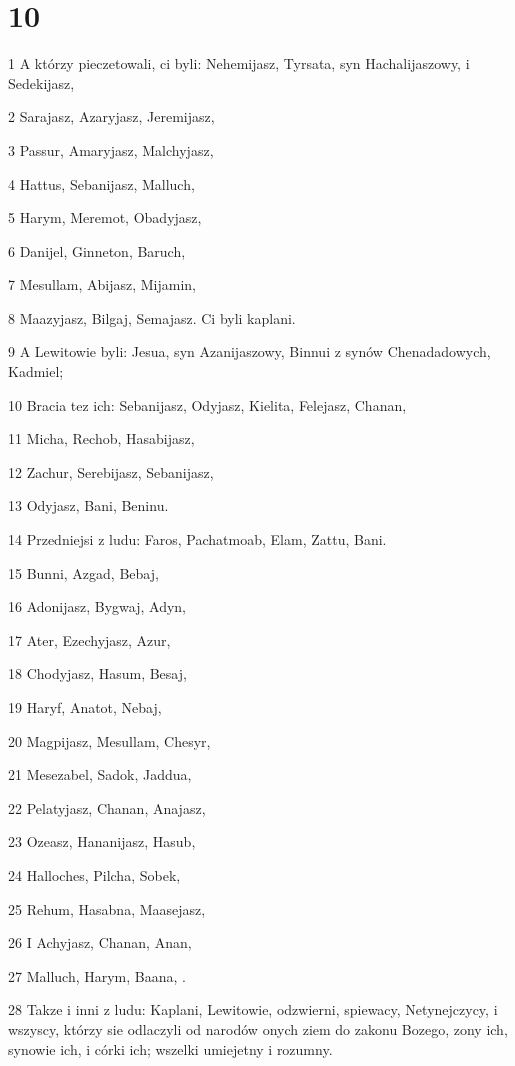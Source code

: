 \chapter{10}

\par 1 A którzy pieczetowali, ci byli: Nehemijasz, Tyrsata, syn Hachalijaszowy, i Sedekijasz,
\par 2 Sarajasz, Azaryjasz, Jeremijasz,
\par 3 Passur, Amaryjasz, Malchyjasz,
\par 4 Hattus, Sebanijasz, Malluch,
\par 5 Harym, Meremot, Obadyjasz,
\par 6 Danijel, Ginneton, Baruch,
\par 7 Mesullam, Abijasz, Mijamin,
\par 8 Maazyjasz, Bilgaj, Semajasz. Ci byli kaplani.
\par 9 A Lewitowie byli: Jesua, syn Azanijaszowy, Binnui z synów Chenadadowych, Kadmiel;
\par 10 Bracia tez ich: Sebanijasz, Odyjasz, Kielita, Felejasz, Chanan,
\par 11 Micha, Rechob, Hasabijasz,
\par 12 Zachur, Serebijasz, Sebanijasz,
\par 13 Odyjasz, Bani, Beninu.
\par 14 Przedniejsi z ludu: Faros, Pachatmoab, Elam, Zattu, Bani.
\par 15 Bunni, Azgad, Bebaj,
\par 16 Adonijasz, Bygwaj, Adyn,
\par 17 Ater, Ezechyjasz, Azur,
\par 18 Chodyjasz, Hasum, Besaj,
\par 19 Haryf, Anatot, Nebaj,
\par 20 Magpijasz, Mesullam, Chesyr,
\par 21 Mesezabel, Sadok, Jaddua,
\par 22 Pelatyjasz, Chanan, Anajasz,
\par 23 Ozeasz, Hananijasz, Hasub,
\par 24 Halloches, Pilcha, Sobek,
\par 25 Rehum, Hasabna, Maasejasz,
\par 26 I Achyjasz, Chanan, Anan,
\par 27 Malluch, Harym, Baana, .
\par 28 Takze i inni z ludu: Kaplani, Lewitowie, odzwierni, spiewacy, Netynejczycy, i wszyscy, którzy sie odlaczyli od narodów onych ziem do zakonu Bozego, zony ich, synowie ich, i córki ich; wszelki umiejetny i rozumny.
